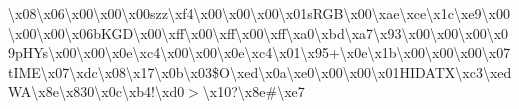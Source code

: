 \textbackslash{}x08\textbackslash{}x06\textbackslash{}x00\textbackslash{}x00\textbackslash{}x00szz\textbackslash{}xf4\textbackslash{}x00\textbackslash{}x00\textbackslash{}x00\textbackslash{}x01s\+R\+G\+B\textbackslash{}x00\textbackslash{}xae\textbackslash{}xce\textbackslash{}x1c\textbackslash{}xe9\textbackslash{}x00\textbackslash{}x00\textbackslash{}x00\textbackslash{}x06b\+K\+G\+D\textbackslash{}x00\textbackslash{}xff\textbackslash{}x00\textbackslash{}xff\textbackslash{}x00\textbackslash{}xff\textbackslash{}xa0\textbackslash{}xbd\textbackslash{}xa7\textbackslash{}x93\textbackslash{}x00\textbackslash{}x00\textbackslash{}x00\textbackslash{}x09p\+H\+Ys\textbackslash{}x00\textbackslash{}x00\textbackslash{}x0e\textbackslash{}xc4\textbackslash{}x00\textbackslash{}x00\textbackslash{}x0e\textbackslash{}xc4\textbackslash{}x01\textbackslash{}x95+\textbackslash{}x0e\textbackslash{}x1b\textbackslash{}x00\textbackslash{}x00\textbackslash{}x00\textbackslash{}x07t\+I\+M\+E\textbackslash{}x07\textbackslash{}xdc\textbackslash{}x08\textbackslash{}x17\textbackslash{}x0b\textbackslash{}x03\$\+O\textbackslash{}xed\textbackslash{}x0a\textbackslash{}xe0\textbackslash{}x00\textbackslash{}x00\textbackslash{}x01\+H\+I\+D\+A\+T\+X\textbackslash{}xc3\textbackslash{}xed\+W\+A\textbackslash{}x8e\textbackslash{}x830\textbackslash{}x0c\textbackslash{}xb4!\textbackslash{}xd0$>$\textbackslash{}x10?\textbackslash{}x8e\#\textbackslash{}xe7 